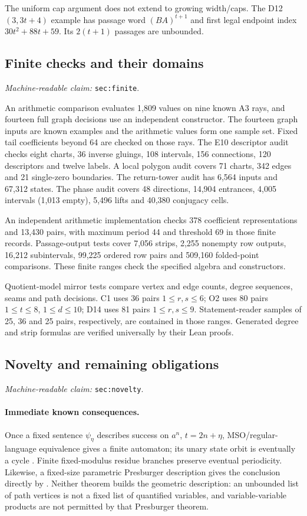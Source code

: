 \documentclass[11pt]{amsart}
\newcommand{\record}[1]{\nolinkurl{#1}}
\newcommand{\claimid}[1]{\par\nopagebreak\noindent\textit{Machine-readable claim:} \record{#1}.\par}
\theoremstyle{definition}\newtheorem{definition}{Definition}
\begin{document}
The uniform cap argument does not extend to growing width/caps.
The D12$(3,3t+4)$ example has passage word $(BA)^{t+1}$ and first
legal endpoint index $30t^2+88t+59$. Its $2(t+1)$ passages are unbounded.

\subsection{Finite checks and their domains}\label{sec:finite}
\claimid{sec:finite}
An arithmetic comparison evaluates 1,809 values on nine known A3
rays, and fourteen full graph decisions use an independent constructor.
The fourteen graph inputs are known examples and the arithmetic
values form one sample set. Fixed tail coefficients beyond 64 are
checked on those rays. The E10 descriptor audit checks eight charts,
36 inverse gluings, 108 intervals, 156 connections, 120 descriptors
and twelve labels. A local polygon audit covers 71 charts, 342 edges
and 21 single-zero boundaries. The return-tower audit has 6,564
inputs and 67,312 states. The phase audit covers 48 directions,
14,904 entrances, 4,005 intervals (1,013 empty), 5,496 lifts and
40,380 conjugacy cells.

An independent arithmetic implementation checks 378 coefficient
representations and 13,430 pairs, with maximum period 44 and
threshold 69 in those finite records. Passage-output tests cover
7,056 strips, 2,255 nonempty row outputs, 16,212 subintervals,
99,225 ordered row pairs and 509,160 folded-point comparisons.
These finite ranges check the specified algebra and constructors.

Quotient-model mirror tests compare vertex and edge counts, degree
sequences, seams and path decisions. C1 uses 36 pairs $1\le r,s\le6$;
O2 uses 80 pairs $1\le t\le8$, $1\le d\le10$; D14 uses 81 pairs
$1\le r,s\le9$. Statement-reader samples of 25, 36 and 25 pairs,
respectively, are contained in those ranges. Generated degree and
strip formulas are verified universally by their Lean proofs.

\subsection{Novelty and remaining obligations}\label{sec:novelty}
\claimid{sec:novelty}
\paragraph{Immediate known consequences.}
Once a fixed sentence $\psi_\eta$ describes success on $a^n$,
$t=2n+\eta$, MSO/regular-language equivalence gives a finite automaton;
its unary state orbit is eventually a cycle \cite[Section 3.1]{MSO}.
Finite fixed-modulus residue branches preserve eventual periodicity.
Likewise, a fixed-size parametric Presburger description gives the
conclusion directly by \cite[Theorem 1.15]{BGW}. Neither theorem builds
the geometric description: an unbounded list of path vertices is not
a fixed list of quantified variables, and variable-variable products
are not permitted by that Presburger theorem.
\end{document}
